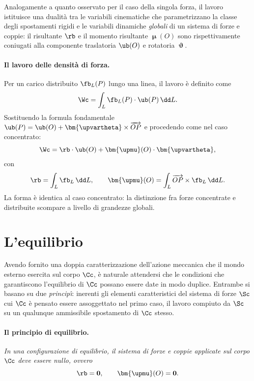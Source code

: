 Analogamente a quanto osservato per il caso della singola forza, il lavoro istituisce una dualità tra le variabili cinematiche 
che parametrizzano la classe degli spostamenti rigidi  e le variabili dinamiche \textit{globali} di un sistema di forze e coppie:
il risultante $\rb$ e il momento risultante $\bm{\upmu}(O)$ sono rispettivamente coniugati alla componente traslatoria $\ub(O)$ e rotatoria $\bm{\upvartheta}$.

\paragraph{Il lavoro delle densità di forza.}
Per un carico distribuito $\fb_L(P)$ lungo una linea, il
lavoro  è definito come
\begin{equation}
	\Wc = \int_L \fb_L(P) \cdot \ub(P)\,\dd L.
\end{equation}
Sostituendo la formula fondamentale
$\ub(P) = \ub(O) + \bm{\upvartheta} \times
\overrightarrow{OP}$ e procedendo come nel caso concentrato:
\begin{equation}
	\Wc = \rb \cdot \ub(O)
	+ \bm{\upmu}(O) \cdot \bm{\upvartheta},
\end{equation}
con
\begin{equation}
	\rb = \int_L \fb_L\,\dd L, \qquad
	\bm{\upmu}(O) = \int_L \overrightarrow{OP}
	\times \fb_L\,\dd L.
\end{equation}
La forma è identica al caso concentrato: la distinzione
fra forze concentrate e distribuite scompare a livello
di grandezze globali.

\section{L'equilibrio}\label{equilibrio}

Avendo fornito una doppia caratterizzazione dell'azione meccanica che 
il mondo esterno esercita sul corpo $\Cc$, è naturale attendersi che 
le condizioni che garantiscono l'equilibrio di $\Cc$ possano essere date in modo duplice.
Entrambe si basano su due \textit{princip\^{\i}}: inerenti gli elementi caratteristici del sistema di forze $\Sc$
cui $\Cc$ è pensato essere assoggettato nel primo caso, il lavoro compiuto da $\Sc$ su un qualunque 
ammissibile spostamento di $\Cc$ stesso. 

\paragraph{Il principio di equilibrio.}
\textit{In una configurazione di equilibrio, il sistema di forze e coppie applicate sul corpo $\Cc$ deve essere \textit{nullo}, ovvero}
\begin{equation}\label{ECS}
\rb=\mathbf{0}, \qquad \bm{\upmu}(O)=\mathbf{0}.
\end{equation}

